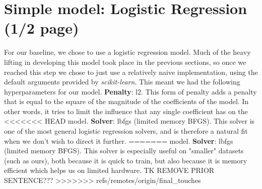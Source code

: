 \section{Simple model: Logistic Regression (1/2 page)} 
For our baseline, we chose to use a logistic regression model. Much of the heavy lifting in developing this model took place in the previous sections,
so once we reached this step we chose to just use a relatively naive implementation, using the default arguments provided
by \textit{scikit-learn}. This meant we had the following hyperparameters for our model. \textbf{Penalty}: l2. This form of penalty adds a penalty that is equal to the square of the magnitude of the
    coefficients of the model. In other words, it tries to limit the influence that any single coefficient has on the
<<<<<<< HEAD
    model. \textbf{Solver}: lbfgs (limited memory BFGS). This solver is one of the most general logistic regression
    solvers, and is therefore a natural fit when we don't wish to direct it further.
=======
    model. \textbf{Solver}: lbfgs (limited memory BFGS). This solver is especially useful on "smaller" datasets (such as
    ours), both because it is quick to train, but also because it is memory efficient which helps us on limited
    hardware. TK REMOVE PRIOR SENTENCE???
>>>>>>> refs/remotes/origin/final_touches

